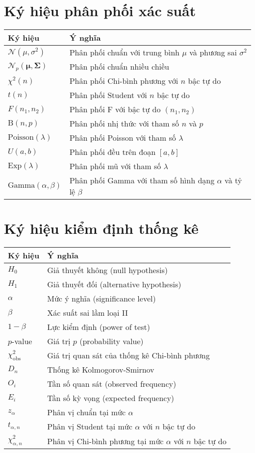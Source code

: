 \section*{Ký hiệu phân phối xác suất}
\begin{longtable}{@{}p{3cm}p{10cm}@{}}
\textbf{Ký hiệu} & \textbf{Ý nghĩa} \\
\hline
\endhead
$\mathcal{N}(\mu,\sigma^2)$ & Phân phối chuẩn với trung bình $\mu$ và phương sai $\sigma^2$ \\
$\mathcal{N}_p(\boldsymbol{\mu},\boldsymbol{\Sigma})$ & Phân phối chuẩn nhiều chiều \\
$\chi^2(n)$ & Phân phối Chi-bình phương với $n$ bậc tự do \\
$t(n)$ & Phân phối Student với $n$ bậc tự do \\
$F(n_1,n_2)$ & Phân phối F với bậc tự do $(n_1,n_2)$ \\
$\text{B}(n,p)$ & Phân phối nhị thức với tham số $n$ và $p$ \\
$\text{Poisson}(\lambda)$ & Phân phối Poisson với tham số $\lambda$ \\
$U(a,b)$ & Phân phối đều trên đoạn $[a,b]$ \\
$\text{Exp}(\lambda)$ & Phân phối mũ với tham số $\lambda$ \\
$\text{Gamma}(\alpha,\beta)$ & Phân phối Gamma với tham số hình dạng $\alpha$ và tỷ lệ $\beta$ \\
\end{longtable}

\section*{Ký hiệu kiểm định thống kê}
\begin{longtable}{@{}p{3cm}p{10cm}@{}}
\textbf{Ký hiệu} & \textbf{Ý nghĩa} \\
\hline
\endhead
$H_0$ & Giả thuyết không (null hypothesis) \\
$H_1$ & Giả thuyết đối (alternative hypothesis) \\
$\alpha$ & Mức ý nghĩa (significance level) \\
$\beta$ & Xác suất sai lầm loại II \\
$1-\beta$ & Lực kiểm định (power of test) \\
$p$-value & Giá trị $p$ (probability value) \\
$\chi^2_{\text{obs}}$ & Giá trị quan sát của thống kê Chi-bình phương \\
$D_n$ & Thống kê Kolmogorov-Smirnov \\
$O_i$ & Tần số quan sát (observed frequency) \\
$E_i$ & Tần số kỳ vọng (expected frequency) \\
$z_{\alpha}$ & Phân vị chuẩn tại mức $\alpha$ \\
$t_{\alpha,n}$ & Phân vị Student tại mức $\alpha$ với $n$ bậc tự do \\
$\chi^2_{\alpha,n}$ & Phân vị Chi-bình phương tại mức $\alpha$ với $n$ bậc tự do \\
\end{longtable}

